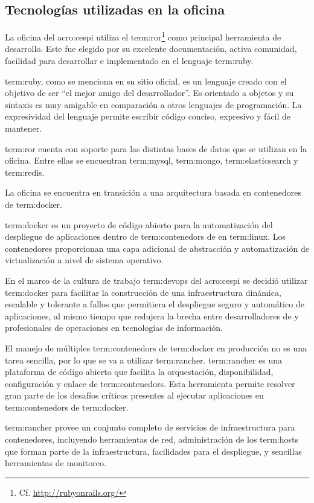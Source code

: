 \subsection{Tecnologías utilizadas en la oficina}
\label{tecnologias_utilizadas}

La oficina del \gls{acro:cespi} utiliza el  
\gls{term:ror}\footnote{Cf.  \url{http://rubyonrails.org/}} como principal
herramienta de desarrollo. Este  fue elegido por su excelente
documentación, activa comunidad, facilidad para desarrollar e implementado en
el lenguaje \gls{term:ruby}.

\gls{term:ruby}, como se menciona en su sitio oficial, es un lenguaje creado
con el objetivo de ser “el mejor amigo del desarrollador”. Es orientado a
objetos y su sintaxis es muy amigable en comparación a otros lenguajes de
programación. La expresividad del lenguaje permite escribir código conciso,
expresivo y fácil de mantener.

\gls{term:ror} cuenta con soporte para las distintas bases de datos que se
utilizan en la oficina. Entre ellas se encuentran \gls{term:mysql},
\gls{term:mongo}, \gls{term:elasticsearch} y \gls{term:redis}.

La oficina se encuentra en transición a una arquitectura basada en contenedores
de \gls{term:docker}.

\gls{term:docker} es un proyecto de código abierto para la automatización del
despliegue de aplicaciones dentro de \glspl{term:contenedor} de 
en \gls{term:linux}. Los contenedores proporcionan una capa adicional de
abstracción y automatización de virtualización a nivel de sistema operativo.

En el marco de la cultura de trabajo \gls{term:devops} del \gls{acro:cespi} se
decidió utilizar \gls{term:docker} para facilitar la construcción de una
infraestructura dinámica, escalable y tolerante a fallos que permitiera el
despliegue seguro y automático de aplicaciones, al mismo tiempo que redujera la
brecha entre desarrolladores de  y profesionales de operaciones
en tecnologías de información.

El manejo de múltiples \glspl{term:contenedor} de \gls{term:docker} en
producción no es una tarea sencilla, por lo que se va a utilizar
\gls{term:rancher}. \gls{term:rancher} es una plataforma de código abierto que
facilita la orquestación, disponibilidad, configuración y enlace de
\glspl{term:contenedor}. Esta herramienta permite resolver gran parte de los
desafíos críticos presentes al ejecutar aplicaciones en \glspl{term:contenedor}
de \gls{term:docker}.

\gls{term:rancher} provee un conjunto completo de servicios de infraestructura
para contenedores, incluyendo herramientas de red, administración de los
\glspl{term:host} que forman parte de la infraestructura, facilidades para el
despliegue,  y sencillas herramientas de monitoreo.
